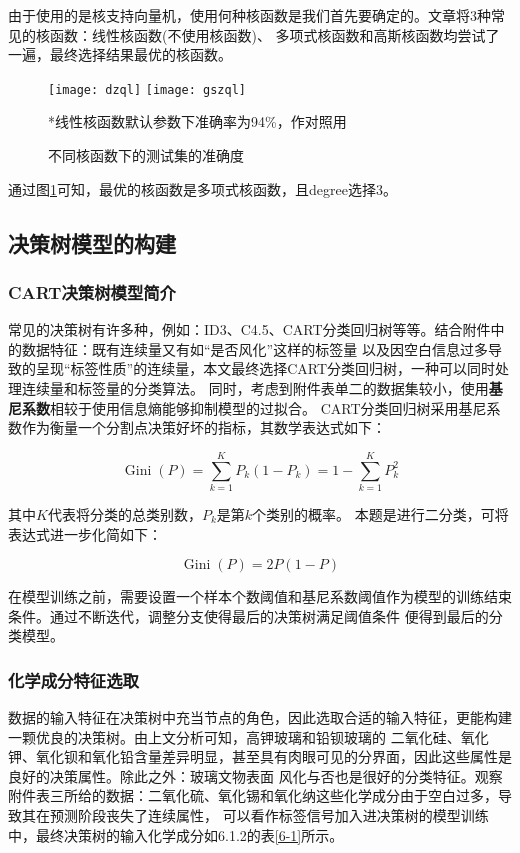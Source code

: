 \documentclass[withoutpreface,bwprint]{cumcmthesis} %
\begin{document}
由于使用的是核支持向量机，使用何种核函数是我们首先要确定的。文章将3种常见的核函数：线性核函数(不使用核函数)、 多项式核函数和高斯核函数均尝试了一遍，最终选择结果最优的核函数。

\begin{figure}[!h]
	\centering
	\texttt{[image: dzql]}
	\texttt{[image: gszql]}
	\caption{不同核函数下的测试集的准确度}
	\footnotesize{*线性核函数默认参数下准确率为94\%，作对照用}
	\label{zqd}
\end{figure}


通过图\ref{zqd}可知，最优的核函数是多项式核函数，且degree选择3。


\subsection{决策树模型的构建}

\subsubsection{CART决策树模型简介}

常见的决策树有许多种，例如：ID3、C4.5、CART分类回归树等等。结合附件中的数据特征：既有连续量又有如“是否风化”这样的标签量 以及因空白信息过多导致的呈现“标签性质”的连续量，本文最终选择CART分类回归树，一种可以同时处理连续量和标签量的分类算法。 同时，考虑到附件表单二的数据集较小，使用\textbf{基尼系数}相较于使用信息熵能够抑制模型的过拟合。 CART分类回归树采用基尼系数作为衡量一个分割点决策好坏的指标，其数学表达式如下：

 $$\operatorname{Gini}(P)=\sum_{k=1}^{K} P_{k}\left(1-P_{k}\right)=1-\sum_{k=1}^{K} P_{k}^{2}$$
 
其中$K$代表将分类的总类别数，$P_k$是第$k$个类别的概率。 本题是进行二分类，可将表达式进一步化简如下：

 $$\operatorname{Gini}(P)=2 P(1-P)$$
 
在模型训练之前，需要设置一个样本个数阈值和基尼系数阈值作为模型的训练结束条件。通过不断迭代，调整分支使得最后的决策树满足阈值条件 便得到最后的分类模型。

\subsubsection{化学成分特征选取}

数据的输入特征在决策树中充当节点的角色，因此选取合适的输入特征，更能构建一颗优良的决策树。由上文分析可知，高钾玻璃和铅钡玻璃的 二氧化硅、氧化钾、氧化钡和氧化铅含量差异明显，甚至具有肉眼可见的分界面，因此这些属性是良好的决策属性。除此之外：玻璃文物表面 风化与否也是很好的分类特征。观察附件表三所给的数据：二氧化硫、氧化锡和氧化纳这些化学成分由于空白过多，导致其在预测阶段丧失了连续属性， 可以看作标签信号加入进决策树的模型训练中，最终决策树的输入化学成分如6.1.2的表\ref{6-1}所示。
\end{document}
